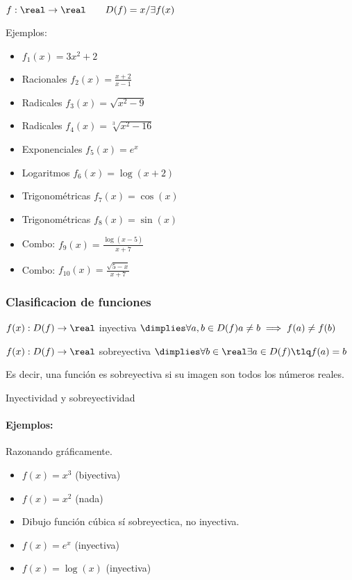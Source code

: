 $f:\real\to\real\quad\quad D(f) = {x / \exists f(x)}$

Ejemplos:
\begin{itemize}
	\item $f_1(x) = 3x^2+2$
	\item Racionales $f_2(x) = \frac{x+2}{x-1}$
	\item Radicales $f_3(x) = \sqrt{x^2-9}$
	\item Radicales $f_4(x) = \sqrt[3]{x^2-16}$
	\item Exponenciales $f_5(x) = e^x$
	\item Logaritmos $f_6(x) = \log(x+2)$
	\item Trigonométricas $f_7(x) = \cos(x)$
	\item Trigonométricas $f_8(x) = \sin(x)$
	\item Combo: $f_9(x) = \frac{\log(x-5)}{x+7}$
	\item Combo: $f_{10}(x) = \frac{\sqrt{5-x}}{x+7}$
\end{itemize}



\subsubsection{Clasificacion de funciones}

\begin{defn}[Inyectividad]
$f(x) : D(f) \to \real$ inyectiva $\dimplies\forall a,b\in D(f) a\neq b \implies f(a) \neq f(b)$
\end{defn} 

\begin{defn}[Sobreyectividad]
	$f(x) : D(f) \to \real$ sobreyectiva $\dimplies \forall b\in\real \exists a\in D(f) \tlq f(a) = b$

	Es decir, una función es sobreyectiva si su imagen son todos los números reales.
\end{defn}


\begin{defn}[Biyectividad] 
	Inyectividad y sobreyectividad
\end{defn}

\paragraph{Ejemplos:} Razonando gráficamente.

\begin{itemize}
	\item $f(x) = x^3$ (biyectiva)
	\item $f(x) = x^2$ (nada)
	\item Dibujo función cúbica sí sobreyectica, no inyectiva.
	\item $f(x) = e^x$ (inyectiva)
	\item $f(x) = \log(x)$ (inyectiva)
\end{itemize}

